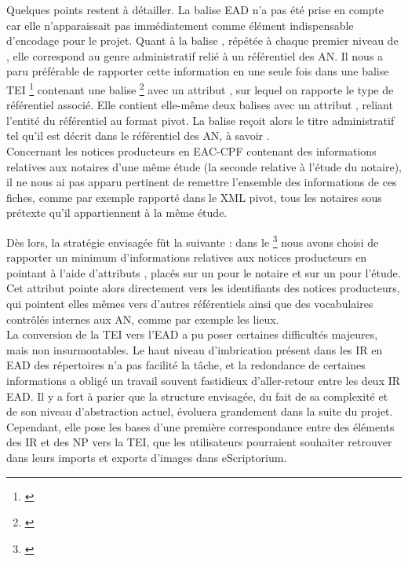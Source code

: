 Quelques points restent à détailler. La balise EAD  n'a pas été prise en compte car elle n'apparaissait pas immédiatement comme élément indispensable d'encodage pour le projet. Quant à la balise , répétée à chaque premier niveau de , elle correspond au genre administratif relié à un référentiel des AN. Il nous a paru préférable de rapporter cette information en une seule fois dans une balise TEI \footnote{\cite{tei_tei_nodate-19}} contenant une balise \footnote{\cite{tei_tei_nodate-18}} avec un attribut , sur lequel on rapporte le type de référentiel associé. Elle contient elle-même deux balises  avec un attribut , reliant l'entité du référentiel au format pivot. La balise reçoit alors le titre administratif tel qu'il est décrit dans le référentiel des AN, à savoir .\\


Concernant les notices producteurs en EAC-CPF contenant des informations relatives aux notaires d'une même étude (la seconde relative à l'étude du notaire), il ne nous ai pas apparu pertinent de remettre l'ensemble des informations de ces fiches, comme par exemple rapporté dans le XML pivot, tous les notaires sous prétexte qu'il appartiennent à la même étude. 

Dès lors, la stratégie envisagée fût la suivante : dans le \footnote{\cite{tei_tei_nodate-17}} nous avons choisi de rapporter un minimum d'informations relatives aux notices producteurs en pointant à l'aide d'attributs , placés sur un  pour le notaire et sur un  pour l'étude. Cet attribut pointe alors directement vers les identifiants des notices producteurs, qui pointent elles mêmes vers d'autres référentiels ainsi que des vocabulaires contrôlés internes aux AN, comme par exemple les lieux.\\

La conversion de la TEI vers l'EAD a pu poser certaines difficultés majeures, mais non insurmontables. Le haut niveau d'imbrication présent dans les IR en EAD des répertoires n'a pas facilité la tâche, et la redondance de certaines informations a obligé un travail souvent fastidieux d'aller-retour entre les deux IR EAD. Il y a fort à parier que la structure envisagée, du fait de sa complexité et de son niveau d'abstraction actuel, évoluera grandement dans la suite du projet. Cependant, elle pose les bases d'une première correspondance entre des éléments des IR et des NP vers la TEI, que les utilisateurs pourraient souhaiter retrouver dans leurs imports et exports d'images dans eScriptorium.

